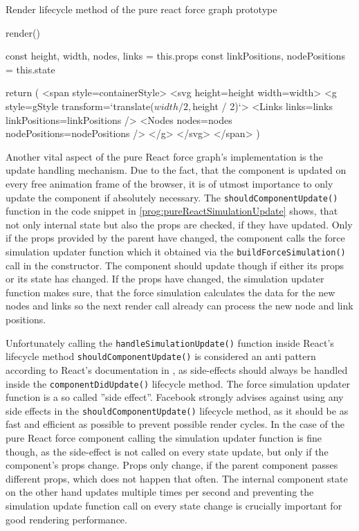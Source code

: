 \begin{program}
\caption{Render lifecycle method of the pure react force graph prototype}
\label{prog:pureReactRender}
\begin{JsCode}
render() {
  const { height, width, nodes, links } = this.props
  const { linkPositions, nodePositions } = this.state
  
  return (
    <span style={containerStyle}>
      <svg height={height} width={width}>
        <g style={gStyle} transform={`translate(${width / 2},${height / 2})`}>
          <Links links={links} linkPositions={linkPositions} />
          <Nodes nodes={nodes} nodePositions={nodePositions} />
        </g>
      </svg>
    </span>
  )
}
\end{JsCode}
\end{program}

Another vital aspect of the pure React force graph's implementation is the update handling mechanism. Due to the fact, that the component is updated on every free animation frame of the browser, it is of utmost importance to only update the component if absolutely necessary. The \texttt{shouldComponentUpdate()} function in the code snippet in \ref{prog:pureReactSimulationUpdate} shows, that not only internal state but also the props are checked, if they have updated. Only if the props provided by the parent have changed, the component calls the force simulation updater function which it obtained via the \texttt{buildForceSimulation()} call in the constructor. The component should update though if either its props or its state has changed. If the props have changed, the simulation updater function makes sure, that the force simulation calculates the data for the new nodes and links so the next render call already can process the new node and link positions.

Unfortunately calling the \texttt{handleSimulationUpdate()} function inside React's lifecycle method \texttt{shouldComponentUpdate()} is considered an anti pattern according to React's documentation in \cite[/docs/react-component.html]{React}, as side-effects should always be handled inside the \texttt{componentDidUpdate()} lifecycle method. The force simulation updater function is a so called ''side effect''. Facebook strongly advises against using any side effects in the \texttt{shouldComponentUpdate()} lifecycle method, as it should be as fast and efficient as possible to prevent possible render cycles. In the case of the pure React force component calling the simulation updater function is fine though, as the side-effect is not called on every state update, but only if the component's props change. Props only change, if the parent component passes different props, which does not happen that often. The internal component state on the other hand updates multiple times per second and preventing the simulation update function call on every state change is crucially important for good rendering performance.

